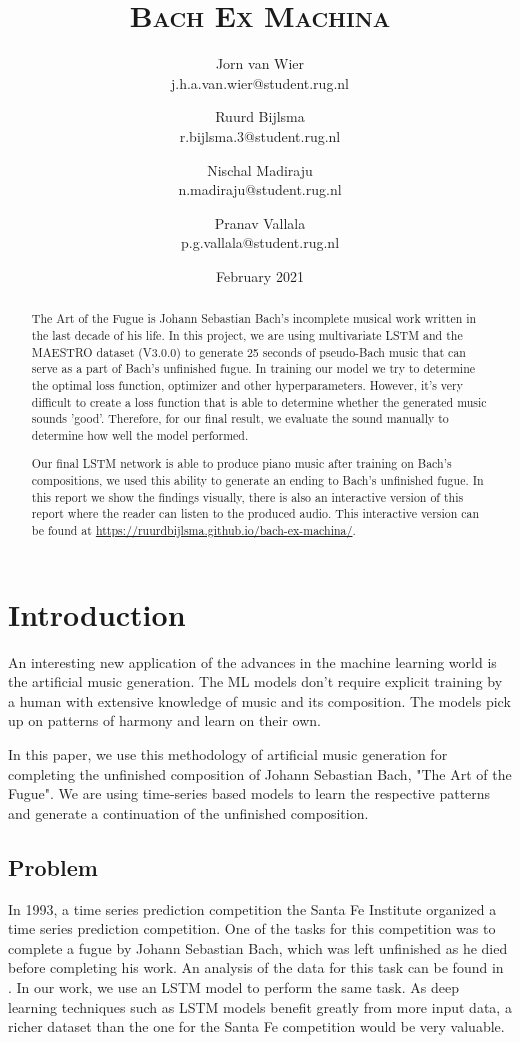 \documentclass[11pt, twocolumn]{article}
\title{\vspace{1.5cm}\textbf{\scshape{Bach Ex Machina}}}
\author{
    Jorn van Wier\\
    \small j.h.a.van.wier@student.rug.nl
    
    \and 
    
    Ruurd Bijlsma\\
    \small r.bijlsma.3@student.rug.nl
    
    \and 
    
    Nischal Madiraju\\
    \small n.madiraju@student.rug.nl
    
    \and 
    
    Pranav Vallala\\
    \small p.g.vallala@student.rug.nl
}
\date{February 2021}
\begin{document}

\maketitle

\thispagestyle{firstpage}

\begin{abstract}
\noindent
The Art of the Fugue is Johann Sebastian Bach's incomplete musical work written in the last decade of his life. In this project, we are using multivariate LSTM and the MAESTRO dataset (V3.0.0) to generate 25 seconds of pseudo-Bach music that can serve as a part of Bach's unfinished fugue. 
In training our model we try to determine the optimal loss function, optimizer and other hyperparameters. However, it's very difficult to create a loss function that is able to determine whether the generated music sounds 'good'. Therefore, for our final result, we evaluate the sound manually to determine how well the model performed.

Our final LSTM network is able to produce piano music after training on Bach's compositions, we used this ability to generate an ending to Bach's unfinished fugue. \ifpdf
In this report we show the findings visually, there is also an interactive version of this report where the reader can listen to the produced audio. This interactive version can be found at \url{https://ruurdbijlsma.github.io/bach-ex-machina/}.
\fi

\end{abstract}
\section{Introduction}
An interesting new application of the advances in the machine learning world is the artificial music generation. The ML models don't require explicit training by a human with extensive knowledge of music and its composition. The models pick up on patterns of harmony and learn on their own. 

In this paper, we use this methodology of artificial music generation for completing the unfinished composition of Johann Sebastian Bach, "The Art of the Fugue". We are using time-series based models to learn the respective patterns and generate a continuation of the unfinished composition. 
\subsection{Problem}
In 1993, a time series prediction competition the Santa Fe Institute organized a time series prediction competition. One of the tasks for this competition was to complete a fugue by Johann Sebastian Bach, which was left unfinished as he died before completing his work. 
An analysis of the data for this task can be found in \cite{dirstt1993baroque}. In our work, we use an LSTM model to perform the same task. As deep learning techniques such as LSTM models benefit greatly from more input data, a richer dataset than the one for the Santa Fe competition would be very valuable.
\end{document}
